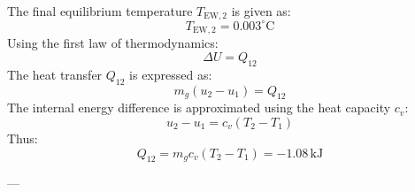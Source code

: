 The final equilibrium temperature \( T_{\text{EW},2} \) is given as:  
\[
T_{\text{EW},2} = 0.003^\circ\text{C}
\]  
Using the first law of thermodynamics:  
\[
\Delta U = Q_{12}
\]  
The heat transfer \( Q_{12} \) is expressed as:  
\[
m_g (u_2 - u_1) = Q_{12}
\]  
The internal energy difference is approximated using the heat capacity \( c_v \):  
\[
u_2 - u_1 = c_v (T_2 - T_1)
\]  
Thus:  
\[
Q_{12} = m_g c_v (T_2 - T_1) = -1.08 \, \text{kJ}
\]  

---